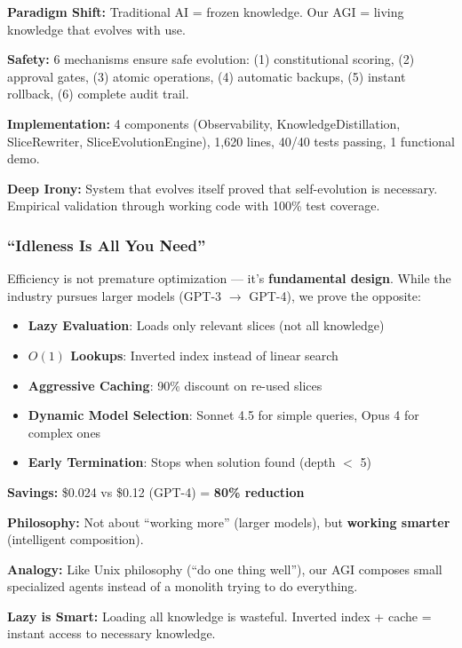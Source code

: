 \documentclass[11pt]{article}
\begin{document}
\textbf{Paradigm Shift:} Traditional AI = frozen knowledge. Our AGI = living knowledge that evolves with use.

\textbf{Safety:} 6 mechanisms ensure safe evolution: (1) constitutional scoring, (2) approval gates, (3) atomic operations, (4) automatic backups, (5) instant rollback, (6) complete audit trail.

\textbf{Implementation:} 4 components (Observability, KnowledgeDistillation, SliceRewriter, SliceEvolutionEngine), 1,620 lines, 40/40 tests passing, 1 functional demo.

\textbf{Deep Irony:} System that evolves itself proved that self-evolution is necessary. Empirical validation through working code with 100\% test coverage.

\subsubsection{``Idleness Is All You Need''}

Efficiency is not premature optimization --- it's \textbf{fundamental design}. While the industry pursues larger models (GPT-3 $\rightarrow$ GPT-4), we prove the opposite:

\begin{itemize}
    \item \textbf{Lazy Evaluation}: Loads only relevant slices (not all knowledge)
    \item \textbf{$O(1)$ Lookups}: Inverted index instead of linear search
    \item \textbf{Aggressive Caching}: 90\% discount on re-used slices
    \item \textbf{Dynamic Model Selection}: Sonnet 4.5 for simple queries, Opus 4 for complex ones
    \item \textbf{Early Termination}: Stops when solution found (depth $<$ 5)
\end{itemize}

\textbf{Savings:} \$0.024 vs \$0.12 (GPT-4) = \textbf{80\% reduction}

\textbf{Philosophy:} Not about ``working more'' (larger models), but \textbf{working smarter} (intelligent composition).

\textbf{Analogy:} Like Unix philosophy (``do one thing well''), our AGI composes small specialized agents instead of a monolith trying to do everything.

\textbf{Lazy is Smart:} Loading all knowledge is wasteful. Inverted index + cache = instant access to necessary knowledge.
\end{document}
